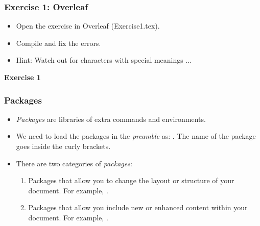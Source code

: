 \documentclass{beamer}
\begin{document}

\begin{frame}
\frametitle{Exercise 1: Overleaf}
\begin{itemize}
\item Open the exercise in Overleaf (Exercise1.tex).
\item Compile and fix the errors.
\item  Hint: Watch out for characters with special meanings ...
\end{itemize}

\textbf{Exercise 1}
\noindent{}
\end{frame}


\begin{frame}[fragile] %
\frametitle{Packages}
\begin{itemize}
\item \textit{Packages} are libraries of extra commands and environments. \\
\item We need to load the packages in the \textit{preamble} as: \color{blue}{\verb|\usepackage{}|} \color{black}{}. The name of the package goes inside the curly brackets. \\
\item There are two categories of \textit{packages}: 
\begin{enumerate}
\item Packages that allow you to change the layout or structure of your document. For example, \color{red}{multicol} \color{black}{}. \\
\item Packages that allow you include new or enhanced content within your document. For example, \color{red}{amsmath} \color{black}{}.  \\
\end{enumerate}
\color{black}
\end{itemize}
\end{frame}
\end{document}
